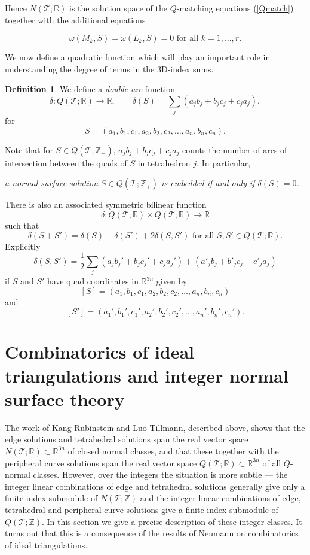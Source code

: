 \documentclass[12pt,reqno]{amsart}  %
\theoremstyle{definition}
\newtheorem{defn}[thm]{Definition}
\theoremstyle{remark}
\def\R{\mathbb{R}}
\def\tri{\mathcal{T}}
\def\be{  \begin{equation} }
\def\ee{  \end{equation} }
\newcommand{\T}{\mathcal{T}}
\def\Z{\mathbb Z}
\begin{document}
Hence $N(\T;\R)$ is the solution space of the $Q$-matching equations 
(\ref{Qmatch}) together with the
additional equations 

\be 
\label{Qmatch_closed}
\omega(M_k,S) = \omega(L_k,S)  = 0 \text{ for all } k = 1, \ldots, r.
\ee

We now define a %
quadratic function which will play an important role 
in understanding the degree of terms in the 3D-index sums.

\begin{defn}
We define a {\em double arc} function 
\be
\delta : Q(\T;\R)  \to \R, \qquad 
\delta(S) = \sum_j ( a_j b_j+b_j c_j + c_j a_j),
\ee
for 
$$
S=(a_1, b_1, c_1, a_2, b_2, c_2, \ldots , a_n, b_n, c_n). 
$$
\end{defn}

Note that for $S \in Q(\tri;\Z_+)$, $a_j b_j +b_j c_j + c_j a_j$ counts the 
number of arcs of intersection between the quads of $S$ in tetrahedron $j$.
In particular,
\begin{center}
\emph{a normal surface solution $S \in Q(\T;\Z_+)$ is embedded if and only 
if $\delta(S)=0$.}
\end{center}

There is also an associated symmetric bilinear function 
$$
\delta : Q(\T;\R) \times Q(\T;\R) \to \R
$$
such that 
\be
\delta(S+S')=\delta(S)+\delta(S') + 2 \delta(S,S') 
\text{ for all } S, S' \in Q(\T;\R) .
\label{bilinear_delta}
\ee
Explicitly
$$
\delta(S,S') = \frac{1}{2}  
\sum_j ( a_j b_j' +b_j c_j' + c_j a_j' )+( a'_j b_j +b'_j c_j + c'_j a_j )
$$
if $S$ and $S'$ have quad coordinates in  $\R^{3n}$ given by
$$
[S]=(a_1, b_1, c_1, a_2, b_2, c_2, \ldots , a_n, b_n, c_n)
$$
and
$$
[S']=(a_1', b_1', c_1', a_2', b_2', c_2', \ldots , a_n', b_n', c_n').
$$


\section{Combinatorics of ideal triangulations and integer 
normal surface theory}
\label{ZNST}

The work of Kang-Rubinstein and Luo-Tillmann, described above, shows that 
the edge solutions and tetrahedral solutions 
span the real vector space $N(\T;\R) \subset \R^{3n}$ of closed normal 
classes, and that these together with the 
peripheral curve solutions span the real vector space 
$Q(\T;\R) \subset \R^{3n}$ of all $Q$-normal classes.
However, over the integers the situation is more subtle --- the integer 
linear combinations of edge and tetrahedral solutions generally give only 
a finite index submodule of $N(\T;\Z)$ and the integer linear combinations 
of edge, tetrahedral and peripheral curve solutions  give a finite index 
submodule of $Q(\T;\Z)$. In this section we give a precise 
description of these integer classes. It turns out that this is a 
consequence of the results of Neumann  \cite{N} on combinatorics of ideal 
triangulations.
\end{document}
